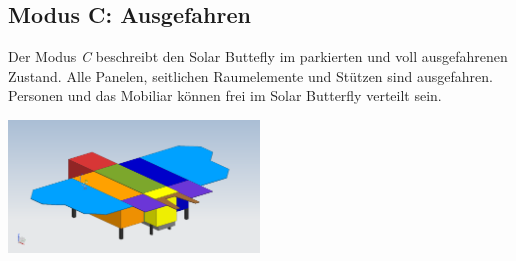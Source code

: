 

\subsection{Modus C: Ausgefahren}
Der Modus \emph{C} beschreibt den Solar Buttefly im parkierten und voll ausgefahrenen Zustand. Alle Panelen, seitlichen Raumelemente und Stützen sind ausgefahren. Personen und das Mobiliar können frei im Solar Butterfly verteilt sein.\\

\begin{center}
  \includegraphics[width=0.5\textwidth]{04_Figures/C.png}
  \label{Modus C}
\end{center}

